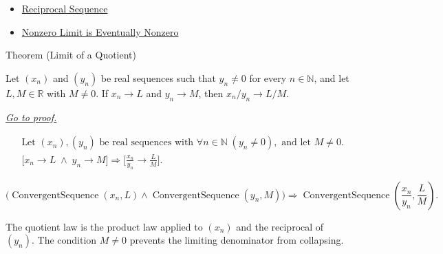\begin{dependencies}
\begin{itemize}
  \item \hyperref[def:reciprocal-sequence]{Reciprocal Sequence}
  \item \hyperref[thm:nonzero-limit-eventually-nonzero]{Nonzero Limit is Eventually Nonzero}
\end{itemize}
\end{dependencies}


\begin{theorembox}{Theorem (Limit of a Quotient)}
\begin{theorem}
\label{thm:limit-of-a-quotient}
Let $(x_n)$ and $(y_n)$ be real sequences such that $y_n\neq 0$ for every
$n\in\mathbb{N}$, and let $L,M\in\mathbb{R}$ with $M\neq 0$. If
$x_n\to L$ and $y_n\to M$, then $x_n/y_n\to L/M$.

\smallskip
\noindent
\hyperref[prf:limit-of-a-quotient]{\textit{Go to proof.}}
\end{theorem}
\end{theorembox}

\begin{remark*}
\[
\begin{aligned}
&\text{Let } (x_n),(y_n) \text{ be real sequences with }
  \forall n\in\mathbb{N}\;(y_n\neq 0), \text{ and let } M\neq 0.\\
&\bigl[
x_n\to L \;\land\; y_n\to M
\bigr]
\Longrightarrow
\bigl[
\frac{x_n}{y_n}\to \frac{L}{M}
\bigr].
\end{aligned}
\]
\end{remark*}

\begin{remark*}
\[
\bigl(
\operatorname{ConvergentSequence}(x_n,L)
\land
\operatorname{ConvergentSequence}(y_n,M)
\bigr)
\Longrightarrow
\operatorname{ConvergentSequence}\left(\frac{x_n}{y_n},\frac{L}{M}\right).
\]
\end{remark*}

\begin{remark*}[Interpretation]
The quotient law is the product law applied to $(x_n)$ and the reciprocal of
$(y_n)$. The condition $M\neq 0$ prevents the limiting denominator from
collapsing.
\end{remark*}

